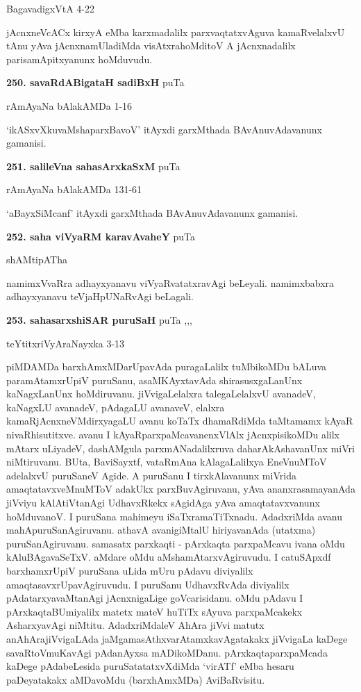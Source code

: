 \hfill BagavadigxVtA 4-22

jAcnxneVcACx kirxyA eMba karxmadalilx parxvaqtatxvAguva kamaRvelalxvU tAnu yAva jAcnxnamUladiMda visAtxrahoMditoV A jAcnxnadalilx parisamApitxyanunx hoMduvudu.

\medskip
\noindent\textbf{250. savaRdABigataH sadiBxH} \hfill puTa \pageref{247e}

\hfill rAmAyaNa bAlakAMDa 1-16

`ikASxvXkuvaMshaparxBavoV' itAyxdi garxMthada BAvAnuvAdavanunx gamanisi.

\medskip
\noindent\textbf{251. salileVna sahasArxkaSxM} \hfill puTa \pageref{248b}

\hfill rAmAyaNa bAlakAMDa 131-61

`aBayxSiMcanf' itAyxdi garxMthada BAvAnuvAdavanunx gamanisi.

\medskip
\noindent\textbf{252. saha viVyaRM karavAvaheY} \hfill puTa \pageref{130b}

\hfill shAMtipATha

namimxVvaRra adhayxyanavu viVyaRvatatxravAgi beLeyali. namimxbabxra adhayxyanavu teVjaHpUNaRvAgi beLagali.

\medskip
\noindent\textbf{253. sahasarxshiSAR puruSaH} \hfill puTa \pageref{108a},\pageref{150c},\pageref{218a},\pageref{249d}

\hfill teYtitxriVyAraNayxka 3-13

piMDAMDa barxhAmxMDarUpavAda puragaLalilx tuMbikoMDu bALuva paramAtamxrUpiV puruSanu, asaMKAyxtavAda shirasusxgaLanUnx kaNagxLanUnx hoMdiruvanu. jiVvigaLelalxra talegaLelalxvU avanadeV, kaNagxLU avanadeV, pAdagaLU avanaveV, elalxra kamaRjAcnxneVMdirxyagaLU avanu koTaTx dhamaRdiMda taMtamamx kAyaR nivaRhisutitxve. avanu I kAyaRparxpaMcavanenxVlAlx jAcnxpisikoMDu alilx mAtarx uLiyadeV, dashAMgula parxmANadalilxruva daharAkAshavanUnx miVri niMtiruvanu. BUta, BaviSayxtf, vataRmAna kAlagaLalilxya EneVnuMToV adelalxvU puruSaneV Agide. A puruSanu I tirxkAlavanunx miVrida amaqtatavxveMnuMToV adakUkx parxBuvAgiruvanu, yAva ananxrasamayanAda jiVviyu kAlAtiVtanAgi UdhavxRkekx sAgidAga yAva amaqtatavxvanunx hoMduvanoV. I puruSana mahimeyu iSaTxramaTiTxnadu. AdadxriMda avanu mahApuruSanAgiruvanu. athavA avanigiMtalU hiriyavanAda (utatxma) puruSanAgiruvanu. samasatx parxkaqti - pArxkaqta parxpaMcavu ivana oMdu kAluBAgavaSeTxV. aMdare oMdu aMshamAtarxvAgiruvudu. I catuSApxdf barxhamxrUpiV puruSana uLida mUru pAdavu diviyalilx amaqtasavxrUpavAgiruvudu. I puruSanu UdhavxRvAda diviyalilx pAdatarxyavaMtanAgi jAcnxnigaLige goVcarisidanu. oMdu pAdavu I pArxkaqtaBUmiyalilx matetx mateV huTiTx sAyuva parxpaMcakekx AsharxyavAgi niMtitu. AdadxriMdaleV AhAra jiVvi matutx anAhArajiVvigaLAda jaMgamasAthxvarAtamxkavAgatakakx jiVvigaLa kaDege savaRtoVmuKavAgi pAdanAyxsa mADikoMDanu. pArxkaqtaparxpaMcada kaDege pAdabeLesida puruSatatatxvXdiMda `virATf' eMba hesaru paDeyatakakx aMDavoMdu (barxhAmxMDa) AviBaRvisitu.

